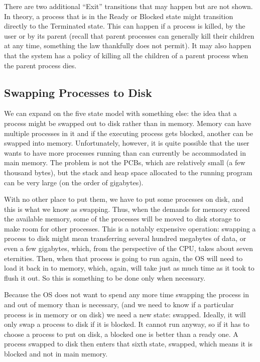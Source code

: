 There are two additional ``Exit'' transitions that may happen but are not shown. In theory, a process that is in the Ready or Blocked state might transition directly to the Terminated state. This can happen if a process is killed, by the user or by its parent (recall that parent processes can generally kill their children at any time, something the law thankfully does not permit). It may also happen that the system has a policy of killing all the children of a parent process when the parent process dies.

\subsection*{Swapping Processes to Disk}
We can expand on the five state model with something else: the idea that a process might be swapped out to disk rather than in memory. Memory can have multiple processes in it and if the executing process gets blocked, another can be swapped into memory. Unfortunately, however, it is quite possible that the user wants to have more processes running than can currently be accommodated in main memory. The problem is not the PCBs, which are relatively small (a few thousand bytes), but the stack and heap space allocated to the running program can be very large (on the order of gigabytes).

With no other place to put them, we have to put some processes on disk, and this is what we know as swapping. Thus, when the demands for memory exceed the available memory, some of the processes will be moved to disk storage to make room for other processes. This is a notably expensive operation: swapping a process to disk might mean transferring several hundred megabytes of data, or even a few gigabytes, which, from the perspective of the CPU, takes about seven eternities. Then, when that process is going to run again, the OS will need to load it back in to memory, which, again, will take just as much time as it took to flush it out. So this is something to be done only when necessary.

Because the OS does not want to spend any more time swapping the process in and out of memory than is necessary, (and we need to know if a particular process is in memory or on disk) we need a new state: swapped.  Ideally, it will only swap a process to disk if it is blocked. It cannot run anyway, so if it has to choose a process to put on disk, a blocked one is better than a ready one. A process swapped to disk then enters that sixth state, swapped, which means it is blocked and not in main memory.

